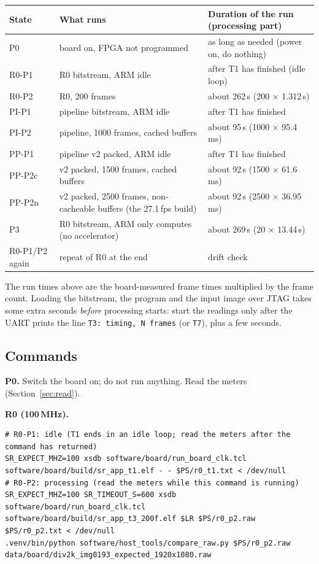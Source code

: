 \documentclass[11pt,a4paper]{article}
\begin{document}
\begin{longtable}{@{}p{}p{}p{}@{}}
\toprule
\textbf{State} & \textbf{What runs} & \textbf{Duration of the run (processing part)} \\ \midrule
\endhead
P0 & board on, FPGA not programmed & as long as needed (power on, do nothing) \\
R0-P1 & R0 bitstream, ARM idle & after T1 has finished (idle loop) \\
R0-P2 & R0, 200 frames & about 262\,s (200 $\times$ 1.312\,s) \\
PI-P1 & pipeline bitstream, ARM idle & after T1 has finished \\
PI-P2 & pipeline, 1000 frames, cached buffers & about 95\,s (1000 $\times$ 95.4\,ms) \\
PP-P1 & pipeline v2 packed, ARM idle & after T1 has finished \\
PP-P2c & v2 packed, 1500 frames, cached buffers & about 92\,s (1500 $\times$ 61.6\,ms) \\
PP-P2n & v2 packed, 2500 frames, non-cacheable buffers (the 27.1\,fps build) & about 92\,s (2500 $\times$ 36.95\,ms) \\
P3 & R0 bitstream, ARM only computes (no accelerator) & about 269\,s (20 $\times$ 13.44\,s) \\
R0-P1/P2 again & repeat of R0 at the end & drift check \\
\bottomrule
\end{longtable}

The run times above are the board-measured frame times multiplied by the frame count. Loading the bitstream, the program and the input image over JTAG takes some extra seconds \emph{before} processing starts: start the readings only after the UART prints the line \texttt{T3: timing, N frames} (or \texttt{T7}), plus a few seconds.

\subsection*{Commands}

\textbf{P0.} Switch the board on; do not run anything. Read the meters (Section~\ref{sec:read}).

\textbf{R0 (100\,MHz).}
\begin{lstlisting}
# R0-P1: idle (T1 ends in an idle loop; read the meters after the command has returned)
SR_EXPECT_MHZ=100 xsdb software/board/run_board_clk.tcl software/board/build/sr_app_t1.elf - - $PS/r0_t1.txt < /dev/null
# R0-P2: processing (read the meters while this command is running)
SR_EXPECT_MHZ=100 SR_TIMEOUT_S=600 xsdb software/board/run_board_clk.tcl software/board/build/sr_app_t3_200f.elf $LR $PS/r0_p2.raw $PS/r0_p2.txt < /dev/null
.venv/bin/python software/host_tools/compare_raw.py $PS/r0_p2.raw data/board/div2k_img0193_expected_1920x1080.raw
\end{lstlisting}
\end{document}
